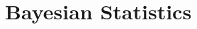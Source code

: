 \documentclass[8pt]{extarticle}
\begin{document}












\section{Bayesian Statistics}
\end{document}
